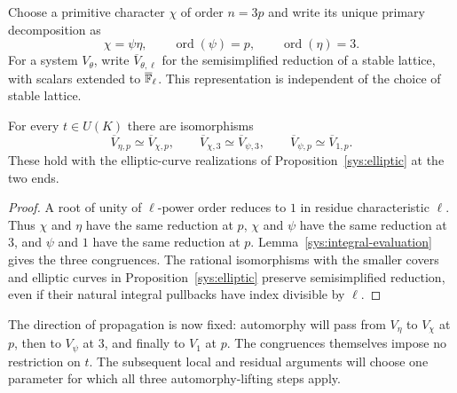 Choose a primitive character $\chi$ of order $n=3p$ and write its
unique primary decomposition as
\[
 \chi=\psi\eta,\qquad \operatorname{ord}(\psi)=p,
 \qquad \operatorname{ord}(\eta)=3.
\]
For a system $V_\theta$, write $\overline V_{\theta,\ell}$ for the
semisimplified reduction of a stable lattice, with scalars extended
to $\overline{\mathbb F}_\ell$.  This representation is independent of the
choice of stable lattice.

\begin{corollary}\label{sys:congruences}
For every $t\in U(K)$ there are isomorphisms
\begin{equation}\label{sys:congruence-chain}
 \overline V_{\eta,p}\simeq\overline V_{\chi,p},
 \qquad
 \overline V_{\chi,3}\simeq\overline V_{\psi,3},
 \qquad
 \overline V_{\psi,p}\simeq\overline V_{1,p}.
\end{equation}
These hold with the elliptic-curve realizations of
Proposition~\ref{sys:elliptic} at the two ends.
\end{corollary}

\begin{proof}
A root of unity of $\ell$-power order reduces to $1$ in residue
characteristic $\ell$.  Thus $\chi$ and $\eta$ have the same
reduction at $p$, $\chi$ and $\psi$ have the same reduction at $3$,
and $\psi$ and $1$ have the same reduction at $p$.
Lemma~\ref{sys:integral-evaluation} gives the three congruences.
The rational isomorphisms with the smaller covers and elliptic
curves in Proposition~\ref{sys:elliptic} preserve semisimplified
reduction, even if their natural integral pullbacks have index
divisible by $\ell$.
\end{proof}

The direction of propagation is now fixed: automorphy will pass
from $V_\eta$ to $V_\chi$ at $p$, then to $V_\psi$ at $3$, and
finally to $V_1$ at $p$.  The congruences themselves impose no
restriction on $t$.  The subsequent local and residual arguments will
choose one parameter for which all three automorphy-lifting steps apply.
